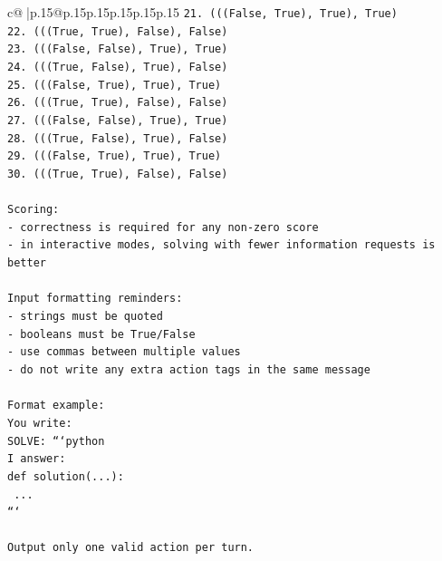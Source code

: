 \documentclass{article}
\begin{document}
{\begin{supertabular}{c@{$\;$}|p{.15\linewidth}@{}p{.15\linewidth}p{.15\linewidth}p{.15\linewidth}p{.15\linewidth}p{.15\linewidth}}
{{{\texttt{21. (((False, True), True), True)} \\
\texttt{22. (((True, True), False), False)} \\
\texttt{23. (((False, False), True), True)} \\
\texttt{24. (((True, False), True), False)} \\
\texttt{25. (((False, True), True), True)} \\
\texttt{26. (((True, True), False), False)} \\
\texttt{27. (((False, False), True), True)} \\
\texttt{28. (((True, False), True), False)} \\
\texttt{29. (((False, True), True), True)} \\
\texttt{30. (((True, True), False), False)} \\
\\ 
\texttt{Scoring:} \\
\texttt{{-} correctness is required for any non{-}zero score} \\
\texttt{{-} in interactive modes, solving with fewer information requests is better} \\
\\ 
\texttt{Input formatting reminders:} \\
\texttt{{-} strings must be quoted} \\
\texttt{{-} booleans must be True/False} \\
\texttt{{-} use commas between multiple values} \\
\texttt{{-} do not write any extra action tags in the same message} \\
\\ 
\texttt{Format example:} \\
\texttt{You write:} \\
\texttt{SOLVE: ```python} \\
\texttt{I answer:} \\
\texttt{def solution(...):} \\
\texttt{    ...} \\
\texttt{```} \\
\\ 
\texttt{Output only one valid action per turn.} \\
            }
        }
    }
     \\ \\


\end{supertabular}}
\end{document}
